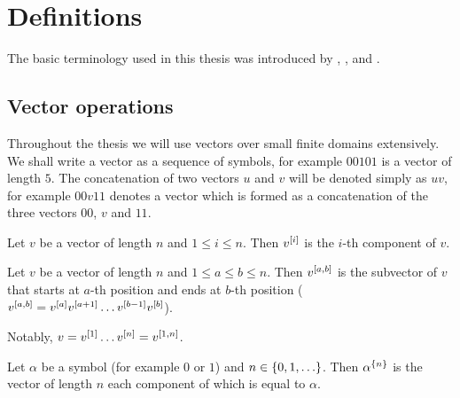 \chapter{Definitions}

The basic terminology used in this thesis
was introduced by
\citet{Crama2011},
\citet{Schieber2005154},
\citet{Dubovsky2012}
and \citet{Husek2014, Husek2015}.

\section{Vector operations}

Throughout the thesis we will use vectors
over small finite domains extensively.
We shall write a vector as a sequence of symbols,
for example $00101$ is a vector of length $5$.
The concatenation of two vectors $u$ and $v$
will be denoted simply as $uv$,
for example $00v11$ denotes a vector
which is formed as a concatenation
of the three vectors $00$, $v$ and $11$.

\begin{definition}
Let $v$ be a vector of length $n$ and $1 \leq i \leq n$.
Then $v^{[i]}$ is the $i$-th component of $v$.
\end{definition}

\begin{definition}
Let
$v$ be a vector of length $n$
and
$1 \leq a \leq b \leq n$.
Then $v^{[a, b]}$ is the subvector of $v$
that starts at $a$-th position
and ends at $b$-th position
($v^{[a, b]}
= v^{[a]} v^{[a+1]}
\ldots v^{[b-1]} v^{[b]}$).
\end{definition}

Notably,
$v = v^{[1]} \ldots v^{[n]} = v^{[1, n]}$.

\begin{definition}
Let $\alpha$ be a symbol (for example $0$ or $1$)
and $n \in \{0, 1, \ldots\}$.
Then $\alpha^{\{n\}}$ is the vector of length $n$
each component of which is equal to $\alpha$.
\end{definition}

